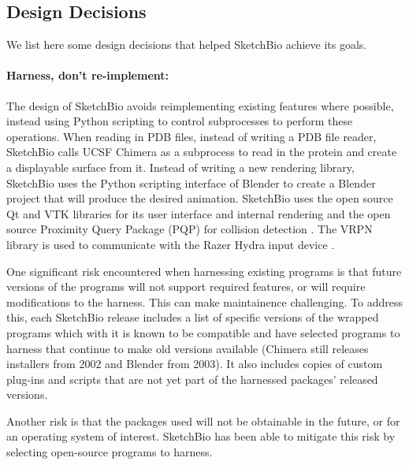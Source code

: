 \documentclass[twocolumn]{bmcart}%
\begin{document}
\subsection*{Design Decisions}
We list here some design decisions that helped SketchBio achieve its goals.

\paragraph*{Harness, don't re-implement:} The design of SketchBio avoids reimplementing existing features where possible, instead using Python scripting to control subprocesses to perform these operations.
When reading in PDB files, instead of writing a PDB file reader, SketchBio calls UCSF Chimera as a subprocess to read in the protein and create a displayable surface from it.
Instead of writing a new rendering library, SketchBio uses the Python scripting interface of Blender to create a Blender project that will produce the desired animation.
SketchBio uses the open source Qt and VTK\cite{VTKbook} libraries for its user interface and internal rendering and the open source Proximity Query Package (PQP) for collision detection \cite{PQP}.
The VRPN library is used to communicate with the Razer Hydra input device \cite{taylor2001vrpn}.

One significant risk encountered when harnessing existing programs is that future versions of the programs will not support required features, or will require modifications to the harness.
This can make maintainence challenging.
To address this, each SketchBio release includes a list of specific versions of the wrapped programs which with it is known to be compatible and have selected programs to harness that continue to make old versions available (Chimera still releases installers from 2002 and Blender from 2003). It also includes copies of custom plug-ins and scripts that are not yet part of the harnessed packages' released versions.

Another risk is that the packages used will not be obtainable in the future, or for an operating system of interest. SketchBio has been able to mitigate this risk by selecting open-source programs to harness.
\end{document}
